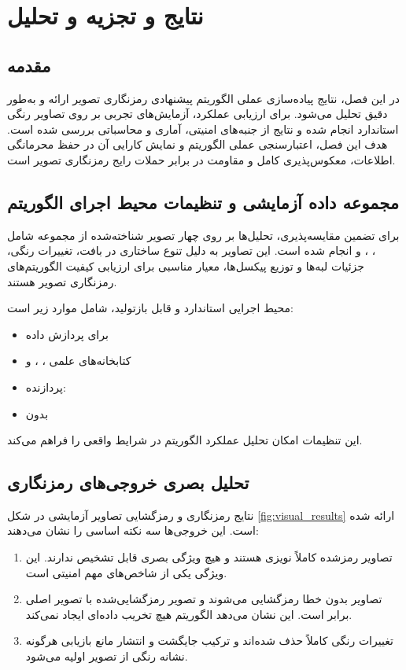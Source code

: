 
\chapter{نتایج و تجزیه و تحلیل}

\section{مقدمه}
در این فصل، نتایج پیاده‌سازی عملی الگوریتم پیشنهادی رمزنگاری تصویر ارائه و به‌طور دقیق تحلیل می‌شود. برای ارزیابی عملکرد، آزمایش‌های تجربی بر روی تصاویر رنگی استاندارد انجام شده و نتایج از جنبه‌های امنیتی، آماری و محاسباتی بررسی شده است. هدف این فصل، اعتبارسنجی عملی الگوریتم و نمایش کارایی آن در حفظ محرمانگی اطلاعات، معکوس‌پذیری کامل و مقاومت در برابر حملات رایج رمزنگاری تصویر است.

\section{مجموعه داده آزمایشی و تنظیمات محیط اجرای الگوریتم}
برای تضمین مقایسه‌پذیری، تحلیل‌ها بر روی چهار تصویر شناخته‌شده از مجموعه  شامل ، ،  و  انجام شده است. این تصاویر به دلیل تنوع ساختاری در بافت، تغییرات رنگی، جزئیات لبه‌ها و توزیع پیکسل‌ها، معیار مناسبی برای ارزیابی کیفیت الگوریتم‌های رمزنگاری تصویر هستند.

محیط اجرایی استاندارد و قابل بازتولید، شامل موارد زیر است:
\begin{itemize}
    \item {} برای پردازش داده
    \item کتابخانه‌های علمی ، ، و 
    \item پردازنده: 
    \item بدون 
\end{itemize}

این تنظیمات امکان تحلیل عملکرد الگوریتم در شرایط واقعی را فراهم می‌کند.

\section{تحلیل بصری خروجی‌های رمزنگاری}
نتایج رمزنگاری و رمزگشایی تصاویر آزمایشی در شکل \ref{fig:visual_results} ارائه شده است. این خروجی‌ها سه نکته اساسی را نشان می‌دهند:
\begin{enumerate}
    \item تصاویر رمزشده کاملاً نویزی هستند و هیچ ویژگی بصری قابل تشخیص ندارند. این ویژگی یکی از شاخص‌های مهم امنیتی است.
    \item تصاویر بدون خطا رمزگشایی می‌شوند و تصویر رمزگشایی‌شده با تصویر اصلی برابر است. این نشان می‌دهد الگوریتم هیچ تخریب داده‌ای ایجاد نمی‌کند.
    \item تغییرات رنگی کاملاً حذف شده‌اند و ترکیب جایگشت و انتشار مانع بازیابی هرگونه نشانه رنگی از تصویر اولیه می‌شود.
\end{enumerate}

